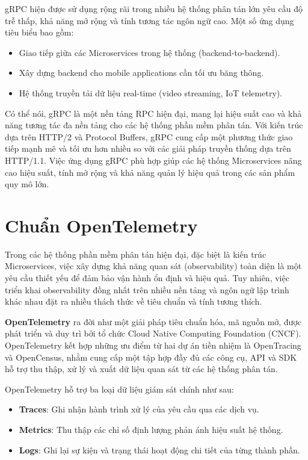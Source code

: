 \documentclass{uetgraduation}
\begin{document}
gRPC hiện được sử dụng rộng rãi trong nhiều hệ thống phân tán lớn yêu cầu độ trễ thấp, khả năng mở rộng và tính tương tác ngôn ngữ cao. Một số ứng dụng tiêu biểu bao gồm:

\begin{itemize}
    \item Giao tiếp giữa các Microservices trong hệ thống (backend-to-backend).
    \item Xây dựng backend cho mobile applications cần tối ưu băng thông.
    \item Hệ thống truyền tải dữ liệu real-time (video streaming, IoT telemetry).
\end{itemize}

Có thể nói, gRPC là một nền tảng RPC hiện đại, mang lại hiệu suất cao và khả năng tương tác đa nền tảng cho các hệ thống phần mềm phân tán. Với kiến trúc dựa trên HTTP/2 và Protocol Buffers, gRPC cung cấp một phương thức giao tiếp mạnh mẽ và tối ưu hơn nhiều so với các giải pháp truyền thống dựa trên HTTP/1.1. Việc ứng dụng gRPC phù hợp giúp các hệ thống Microservices nâng cao hiệu suất, tính mở rộng và khả năng quản lý hiệu quả trong các sản phẩm quy mô lớn.


\section{Chuẩn OpenTelemetry}

Trong các hệ thống phần mềm phân tán hiện đại, đặc biệt là kiến trúc Microservices, việc xây dựng khả năng quan sát (observability) toàn diện là một yêu cầu thiết yếu để đảm bảo vận hành ổn định và hiệu quả. Tuy nhiên, việc triển khai observability đồng nhất trên nhiều nền tảng và ngôn ngữ lập trình khác nhau đặt ra nhiều thách thức về tiêu chuẩn và tính tương thích.

\textbf{OpenTelemetry} \cite{otel} ra đời như một giải pháp tiêu chuẩn hóa, mã nguồn mở, được phát triển và duy trì bởi tổ chức Cloud Native Computing Foundation (CNCF). OpenTelemetry kết hợp những ưu điểm từ hai dự án tiền nhiệm là OpenTracing và OpenCensus, nhằm cung cấp một tập hợp đầy đủ các công cụ, API và SDK hỗ trợ thu thập, xử lý và xuất dữ liệu quan sát từ các hệ thống phân tán.

OpenTelemetry hỗ trợ ba loại dữ liệu giám sát chính như sau:

\begin{itemize}
    \item \textbf{Traces}: Ghi nhận hành trình xử lý của yêu cầu qua các dịch vụ.
    \item \textbf{Metrics}: Thu thập các chỉ số định lượng phản ánh hiệu suất hệ thống.
    \item \textbf{Logs}: Ghi lại sự kiện và trạng thái hoạt động chi tiết của từng thành phần.
\end{itemize}
\end{document}
